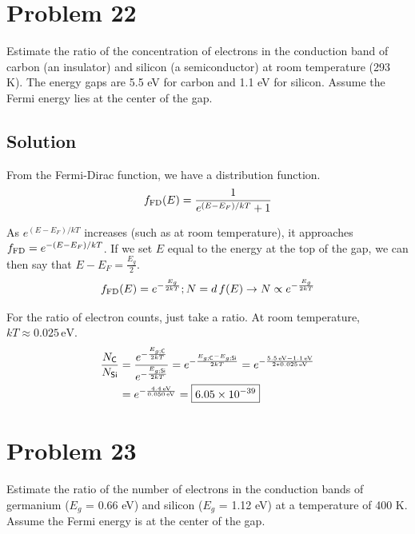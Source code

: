 \documentclass[12pt]{article}
\newcommand{\e}[1]{e^{#1}}
\newcommand{\E}[1]{\times 10^{#1}}
\begin{document}
\section{Problem 22} %
    Estimate the ratio of the concentration of electrons in the conduction band of carbon (an insulator) and silicon (a semiconductor) at room temperature (293 K). 
    The energy gaps are 5.5 eV for carbon and 1.1 eV for silicon. 
    Assume the Fermi energy lies at the center of the gap.

    \subsection{Solution}
        From the Fermi-Dirac function, we have a distribution function.
        \begin{equation}
            f_{\rm FD}(E) = \frac{1}{\e{(E-E_F)/kT} + 1}
        \end{equation}

        As $\e{(E-E_F)/kT}$ increases (such as at room temperature), it approaches $f_{\rm FD} = \e{-(E-E_F)/kT}$.
        If we set $E$ equal to the energy at the top of the gap, we can then say that $E - E_F = \frac{E_g}{2}$.
        \begin{equation}
            f_{\rm FD}(E) = \e{-\frac{E_g}{2kT}} ; N = d\,f(E) \to N \propto \e{-\frac{E_g}{2kT}}
        \end{equation}

        For the ratio of electron counts, just take a ratio.
        At room temperature, $kT \approx 0.025\,\unit{\eV}$.
        \begin{align}
            \frac{N_{\ce{C}}}{N_{\ce{Si}}} &= \frac{\e{-\frac{E_{g;\ce{C}}}{2kT}}}{\e{-\frac{E_{g;\ce{Si}}}{2kT}}}
                =   \e{-\frac{E_{g;\ce{C}} - E_{g;\ce{Si}}}{2kT}}
                =   \e{-\frac{5.5\,\unit{\eV} - 1.1\,\unit{\eV}}{2*0.025\,\unit{\eV}}}\\
                &=  \e{-\frac{4.4\,\unit{\eV}}{0.050\,\unit{\eV}}}
                =   \boxed{6.05\E{-39}}
        \end{align}
    \pagebreak

\section{Problem 23}
    Estimate the ratio of the number of electrons in the conduction bands of germanium ($E_g$ = 0.66 eV) and silicon ($E_g$ = 1.12 eV) at a temperature of 400 K. 
    Assume the Fermi energy is at the center of the gap.
\end{document}

